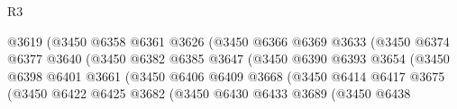 \begin{lexlean}{R3}
\begin{coremodule}
                                            @3619
                                            (@3450
                                              @6358
                                              @6361
                                              @3626
                                              (@3450
                                                @6366
                                                @6369
                                                @3633
                                                (@3450
                                                  @6374
                                                  @6377
                                                  @3640
                                                  (@3450
                                                    @6382
                                                    @6385
                                                    @3647
                                                    (@3450
                                                      @6390
                                                      @6393
                                                      @3654
                                                      (@3450
                                                        @6398
                                                        @6401
                                                        @3661
                                                        (@3450
                                                          @6406
                                                          @6409
                                                          @3668
                                                          (@3450
                                                            @6414
                                                            @6417
                                                            @3675
                                                            (@3450
                                                              @6422
                                                              @6425
                                                              @3682
                                                              (@3450
                                                                @6430
                                                                @6433
                                                                @3689
                                                                (@3450
                                                                  @6438

\end{coremodule}
\end{lexlean}

